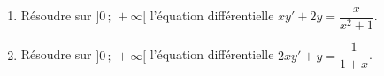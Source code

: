 
\begin{exercice}\label{exostarterST-0026}

  \begin{enumerate}
  \item  Résoudre  sur $]0\,;\,+\infty[$ l'équation différentielle $xy'+2y=\dfrac{x}{x^2+1}$.
\item Résoudre  sur $]0\,;\,+\infty[$ l'équation différentielle $2xy'+y=\dfrac{1}{1+x}$.
  \end{enumerate}
  

\end{exercice}
